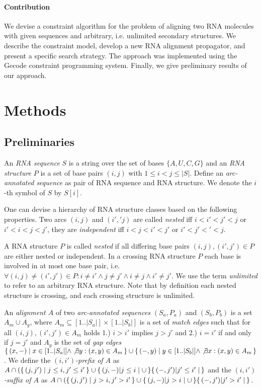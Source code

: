 \documentclass[11pt]{llncs}
\newcommand*{\PSET}[2]{\{\,#1\mid#2\,\}}
\begin{document}
\paragraph{Contribution} We devise a constraint algorithm for the
problem of aligning two RNA molecules with given sequences and
arbitrary, i.e. unlimited secondary structures. We describe the
constraint model, develop a new RNA alignment propagator, and present
a specific search strategy. The approach was implemented using the
Gecode constraint programming system. Finally, we give preliminary
results of our approach.

\section{Methods}

\subsection{Preliminaries}
An \emph{RNA sequence} $S$ is a string over the set of bases
$\{A,U,C,G\}$ and an \emph{RNA structure} $P$ is a set of base pairs
$(i,j)$ with $1 \leq i< j \leq |S|$. Define an \emph{arc-annotated
  sequence} as pair of RNA sequence and RNA structure.  We denote the
$i$-th symbol of $S$ by $S[i]$.

One can devise a hierarchy of RNA structure classes based on the
following properties. Two arcs $(i,j)$ and $(i','j)$ are called
\emph{nested} iff $i<i'<j'<j$ or $i'<i<j<j'$, they are
\emph{independent} iff $i<j<i'<j'$ or $i'<j'<'<j$.

A RNA structure $P$ is called \emph{nested} if all differing base
pairs $(i,j),(i',j')\in P$ are either nested or independent.  In a
crossing RNA structure $P$ each base is involved in at most one base
pair, i.e. $\forall (i,j)\neq(i',j')\in P: i\neq i' \land j\neq j'
\land i\neq j \land i'\neq j'$. We use the term \emph{unlimited} to
refer to an arbitrary RNA structure. Note that by definition each
nested structure is crossing, and each crossing structure is
unlimited.

An \emph{alignment $A$} of two \emph{arc-annotated sequences}
$(S_a,P_a)$ and $(S_b,P_b)$ is a set $A_m\cup A_g$, where
$A_m\subseteq [1..|S_a|] \times [1..|S_b|]$ is a set of \emph{match
  edges} such that for all $(i,j),(i',j')\in A_m$ holds 1.) $i>i'$
implies $j>j'$ and 2.)  $i=i'$ if and only if $j=j'$ and $A_g$ is the
set of \emph{gap edges} $\PSET{(x,-)}{x\in [1..|S_a|]\land \not\exists
  y: (x,y)\in A_m}\cup\PSET{(-,y)}{y\in [1..|S_b|]\land \not\exists x:
  (x,y)\in A_m}$.
%
We define the \emph{$(i,i')$-prefix of $A$} as
$A\cap(\PSET{(j,j')}{j\leq i,j'\leq i'}\cup\PSET{(j,-)|j\leq i}\cup\PSET{(-,j')|j'\leq i'}$
and the  \emph{$(i,i')$-suffix of $A$} as
$A\cap(\PSET{(j,j')}{j>i,j'>i'}\cup\PSET{(j,-)|j>i}\cup\PSET{(-,j')|j'>i'}$.
\end{document}
